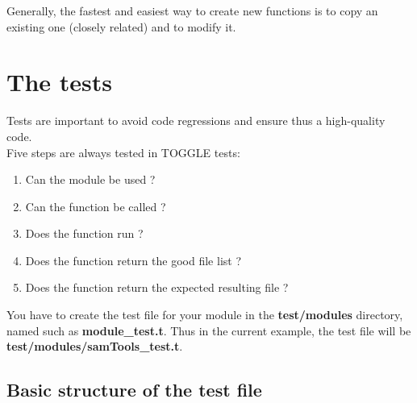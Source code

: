 \documentclass[a4paper,10pt]{report}
\begin{document}
Generally, the fastest and easiest way to create new functions is to copy an existing one (closely related) and to modify it.

\newpage



\chapter{The tests}

Tests are important to avoid code regressions and ensure thus a high-quality code.\\

\noindent Five steps are always tested in TOGGLE tests:

\begin{enumerate}
 \item Can the module be used ? 
 \item Can the function be called ? 
 \item Does the function run ? 
 \item Does the function return the good file list ?
 \item Does the function return the expected resulting file ?
\end{enumerate}

\noindent  You have to create the test file for your module in the \textbf{test/modules} directory, named such as \textbf{module\_test.t}. Thus in the current example, the test file will be \textbf{test/modules/samTools\_test.t}.

\section{Basic structure of the test file}
\end{document}
